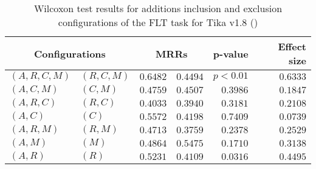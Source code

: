 
\begin{table}
\begin{spacing}{1.2}
\centering
\caption{Wilcoxon test results for additions inclusion and exclusion configurations of the FLT task for Tika v1.8 (\ctwo)}
\label{table:versus-wilcox-tika-flt-additions}
\begin{tabular}{ll|rr|rr}
\toprule
      \multicolumn{2}{c|}{Configurations} &                \multicolumn{2}{c|}{MRRs} &             p-value & Effect size \\
\midrule
 $(A,R,C,M)$ &  $(R,C,M)$ &  $\bm{0.6482}$ &       $0.4494$ & $p<0.01$ &    $0.6333$ \\
   $(A,C,M)$ &    $(C,M)$ &  $\bm{0.4759}$ &       $0.4507$ & $0.3986$ &    $0.1847$ \\
   $(A,R,C)$ &    $(R,C)$ &  $\bm{0.4033}$ &       $0.3940$ & $0.3181$ &    $0.2108$ \\
     $(A,C)$ &      $(C)$ &  $\bm{0.5572}$ &       $0.4198$ & $0.7409$ &    $0.0739$ \\
   $(A,R,M)$ &    $(R,M)$ &  $\bm{0.4713}$ &       $0.3759$ & $0.2378$ &    $0.2529$ \\
     $(A,M)$ &      $(M)$ &       $0.4864$ &  $\bm{0.5475}$ & $0.1710$ &    $0.3138$ \\
     $(A,R)$ &      $(R)$ &  $\bm{0.5231}$ &       $0.4109$ & $0.0316$ &    $0.4495$ \\
\bottomrule
\end{tabular}

\end{spacing}
\end{table}

